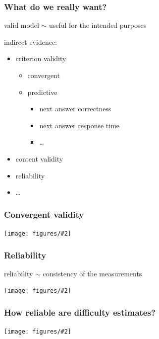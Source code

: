 \documentclass[bigger]{beamer}
\newcommand{\img}[2]{
  \begin{center}
    \texttt{[image: figures/\#2]}
  \end{center}
}
\begin{document}
\begin{frame}
  \frametitle{What do we really want?}
  valid model $\sim$ useful for the intended purposes
  \pause

  \medskip
  indirect evidence:
  \vspace{-0.1cm}
  \begin{itemize}
    \item criterion validity
    \begin{itemize}
      \item convergent
      \item predictive
      \begin{itemize}
        \item \alert{next answer correctness}
        \item next answer response time
        \item \ldots
      \end{itemize}
    \end{itemize}
    \item content validity
    \item reliability
    \item \ldots
  \end{itemize}
\end{frame}


\begin{frame}
  \frametitle{Convergent validity}
  \bigskip
  \img{0.5}{convergent-validity}
\end{frame}


\begin{frame}
  \frametitle{Reliability}
  \begin{center}
  reliability $\sim$ consistency of the measurements
  \end{center}
  \medskip
  \img{0.7}{targets}
\end{frame}


\begin{frame}
  \frametitle{How reliable are difficulty estimates?}
  \bigskip
  \img{0.9}{reliability-difficulties}
\end{frame}
\end{document}

